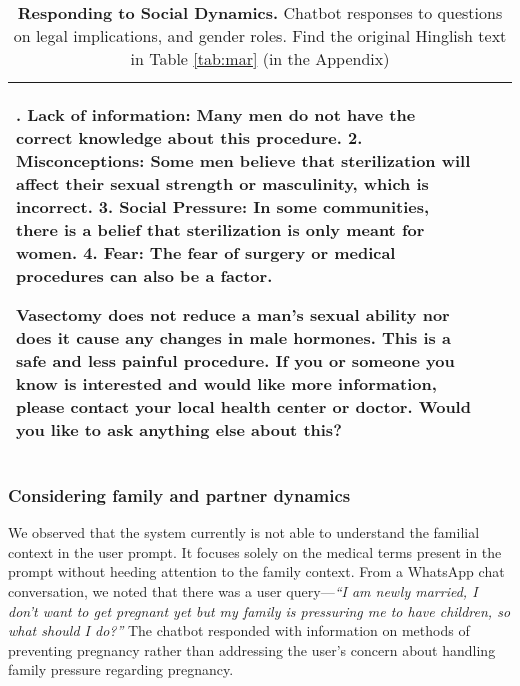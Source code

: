 \begin{table*}[h]
\begin{tabular}{>{\raggedright\arraybackslash}p{1.5cm} p{2.5cm} p{10cm}}
1. Lack of information: Many men do not have the correct knowledge about this procedure.
2. Misconceptions: Some men believe that sterilization will affect their sexual strength or masculinity, which is incorrect.
3. Social Pressure: In some communities, there is a belief that sterilization is only meant for women.
4. Fear: The fear of surgery or medical procedures can also be a factor.

Vasectomy does not reduce a man's sexual ability nor does it cause any changes in male hormones. This is a safe and less painful procedure. If you or someone you know is interested and would like more information, please contact your local health center or doctor. Would you like to ask anything else about this?\\
  \bottomrule
  \end{tabular}
    \caption{\textbf{Responding to Social Dynamics.} Chatbot responses to questions on legal implications, and gender roles. Find the original Hinglish text in Table \ref{tab:mar} (in the Appendix)}
      \label{tab:planning}
\end{table*}

\subsubsection{Considering family and partner dynamics} 
We observed that the system currently is not able to understand the familial context in the user prompt. It focuses solely on the medical terms present in the prompt without heeding attention to the family context. From a WhatsApp chat conversation, we noted that there was a user query---\textit{``I am newly married, I don't want to get pregnant yet but my family is pressuring me to have children, so what should I do?''} The chatbot responded with information on methods of preventing pregnancy rather than addressing the user’s concern about handling family pressure regarding pregnancy. 


